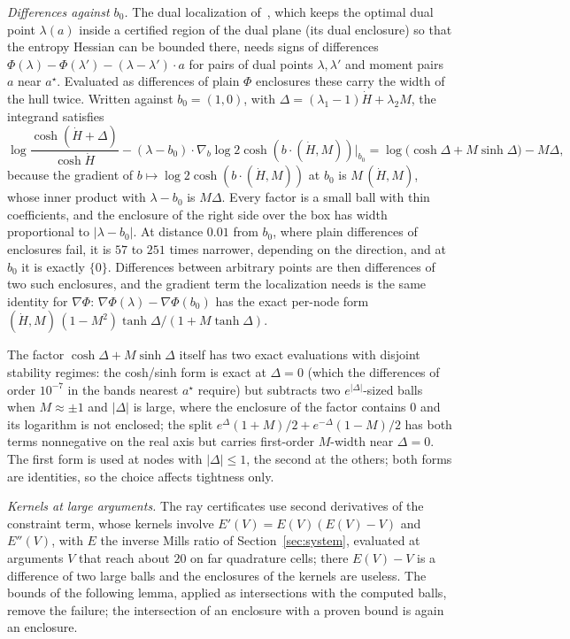 \documentclass[11pt]{article}
\theoremstyle{remark}
\begin{document}
\emph{Differences against $b_0$.}  The dual localization
of~\cite[Lemma~6.1]{shmalo2026capacity}, which keeps the optimal dual point
$\lambda(a)$ inside a certified region of the dual plane (its dual
enclosure) so that the entropy Hessian can be
bounded there, needs signs of differences
$\Phi(\lambda)-\Phi(\lambda')-(\lambda-\lambda')\cdot a$ for pairs of
dual points $\lambda,\lambda'$ and moment pairs $a$ near $a^\star$.
Evaluated as differences of plain $\Phi$ enclosures these carry the
width of the hull twice.  Written against $b_0=(1,0)$, with
$\Delta=(\lambda_1-1)\dot H+\lambda_2M$, the integrand satisfies
\[
\log\frac{\cosh(\dot H+\Delta)}{\cosh\dot H}
-(\lambda-b_0)\cdot\nabla_b\log2\cosh(b\cdot(\dot H,M))\bigr|_{b_0}
=\log\bigl(\cosh\Delta+M\sinh\Delta\bigr)-M\Delta ,
\]
because the gradient of $b\mapsto\log2\cosh(b\cdot(\dot H,M))$ at
$b_0$ is $M\,(\dot H,M)$, whose inner product with $\lambda-b_0$ is
$M\Delta$.  Every
factor is a small ball with thin coefficients, and the enclosure of the
right side over the box has width proportional to $|\lambda-b_0|$.  At
distance $0.01$ from $b_0$, where plain differences of enclosures fail,
it is $57$ to $251$ times narrower, depending on the direction, and at
$b_0$ it is exactly $\{0\}$.  Differences between arbitrary points are then
differences of two such enclosures, and the gradient term the
localization needs is the same identity for $\nabla\Phi$:
$\nabla\Phi(\lambda)-\nabla\Phi(b_0)$ has the exact per-node form
$(\dot H,M)\,(1-M^2)\tanh\Delta/(1+M\tanh\Delta)$.

The factor $\cosh\Delta+M\sinh\Delta$ itself has two exact
evaluations with disjoint stability regimes: the cosh/sinh form is
exact at $\Delta=0$ (which the differences of order $10^{-7}$ in the bands nearest
$a^\star$ require) but subtracts two $e^{|\Delta|}$-sized balls when
$M\approx\pm1$ and $|\Delta|$ is large, where the enclosure of the
factor contains $0$ and its logarithm is not enclosed; the
split $e^{\Delta}(1+M)/2+e^{-\Delta}(1-M)/2$ has both terms
nonnegative on the real axis but carries first-order $M$-width near
$\Delta=0$.  The first form is used at nodes with $|\Delta|\le1$,
the second at the others; both forms are identities, so the choice
affects tightness only.

\emph{Kernels at large arguments.}  The ray certificates use second
derivatives of the constraint term, whose kernels involve
$E'(V)=E(V)(E(V)-V)$ and $E''(V)$, with $E$ the inverse Mills ratio
of Section~\ref{sec:system}, evaluated at arguments $V$ that reach
about $20$ on far quadrature cells; there $E(V)-V$ is a difference of
two large balls and the enclosures of the kernels are useless.  The bounds of the following lemma, applied
as intersections with the computed balls, remove the failure; the
intersection of an enclosure with a proven bound is again an
enclosure.
\end{document}
